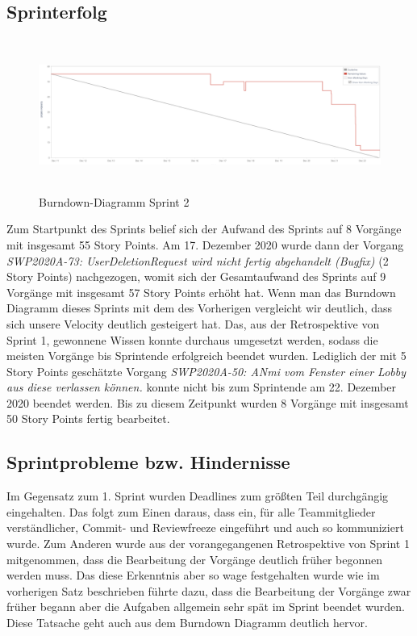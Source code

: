 \documentclass[12pt,a4paper, oneside]{article}
\begin{document}
    \subsection{Sprinterfolg}
    \begin{figure}[h]
        \centering
        \includegraphics[width=\textwidth, height=5cm]{../img/sprint_02/Burndown-Sprint2.PNG}
        \caption{Burndown-Diagramm Sprint 2}
        \label{fig: Burndown-Sprint2}
    \end{figure}

    \noindent
    Zum Startpunkt des Sprints belief sich der Aufwand des Sprints auf 8 Vorgänge mit insgesamt 55 Story Points. Am 17. Dezember 2020 wurde dann der Vorgang \textit{SWP2020A-73: UserDeletionRequest wird nicht fertig abgehandelt (Bugfix)} (2 Story Points) nachgezogen, womit sich der Gesamtaufwand des Sprints auf 9 Vorgänge mit insgesamt 57 Story Points erhöht hat. Wenn man das Burndown Diagramm dieses Sprints mit dem des Vorherigen vergleicht wir deutlich, dass sich unsere Velocity deutlich gesteigert hat. Das, aus der Retrospektive von Sprint 1, gewonnene Wissen konnte durchaus umgesetzt werden, sodass die meisten Vorgänge bis Sprintende erfolgreich beendet wurden. Lediglich der mit 5 Story Points geschätzte Vorgang \textit{SWP2020A-50: ANmi vom Fenster einer Lobby aus diese verlassen können.} konnte nicht bis zum Sprintende am 22. Dezember 2020 beendet werden. Bis zu diesem Zeitpunkt wurden 8 Vorgänge mit insgesamt 50 Story Points fertig bearbeitet.

    \subsection{Sprintprobleme bzw. Hindernisse}

    Im Gegensatz zum 1. Sprint wurden Deadlines zum größten Teil durchgängig eingehalten. Das folgt zum Einen daraus, dass ein, für alle Teammitglieder verständlicher, Commit- und Reviewfreeze eingeführt und auch so kommuniziert wurde. Zum Anderen wurde aus der vorangegangenen Retrospektive von Sprint 1 mitgenommen, dass die Bearbeitung der Vorgänge deutlich früher begonnen werden muss. Das diese Erkenntnis aber so wage festgehalten wurde wie im vorherigen Satz beschrieben führte dazu, dass die Bearbeitung der Vorgänge zwar früher begann aber die Aufgaben allgemein sehr spät im Sprint beendet wurden. Diese Tatsache geht auch aus dem Burndown Diagramm deutlich hervor.
\end{document}
